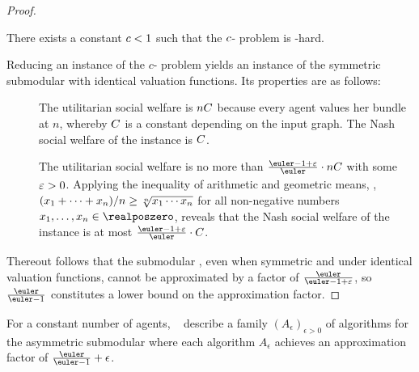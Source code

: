 \begin{proof}
	\begin{proposition}
		There exists a constant \(c < 1\) such that the \(c\)-\Gap{} problem is \compNP\kern1.5pt-hard.
	\end{proposition}

	\medskip
	Reducing an instance of the \(c\)-\Gap{} problem yields an instance of the symmetric submodular \USW{} with identical valuation functions.
	Its properties are as follows:
	\begin{description}
		\item[\Yes]
		The utilitarian social welfare is \(n C\) because every agent values her bundle at \(n\), whereby \(C\) is a constant depending on the input graph.
		The Nash social welfare of the instance is \(C\).

		\item[\No]
		The utilitarian social welfare is no more than \(\afinv \cdot n \USWconstant\) with some \(\varepsilon > 0\).
		Applying the inequality of arithmetic and geometric means, \ie{}, \((x_1 + \dots + x_n)/n \ge \smash{\sqrt[n]{x_1 \dotsm x_n}}\) for all non-negative numbers \(x_1, \dots, x_n \in \realposzero\), reveals that the Nash social welfare of the instance is at most \(\afinv \cdot \USWconstant\).
	\end{description}
	Thereout follows that the submodular \NSW{}, even when symmetric and under identical valuation functions, cannot be approximated by a factor of \(\afconst\), so \(\af\) constitutes a lower bound on the approximation factor.
\end{proof}

For a constant number of agents, \citeauthor{APNSWuSVþUM}~\cite[Section 5.1]{APNSWuSVþUM} describe a family \((A_{\epsilon})_{\epsilon > 0}\) of algorithms for the asymmetric submodular \NSW{} where each algorithm \(A_\epsilon\) achieves an approximation factor of \(\af + \epsilon\).

